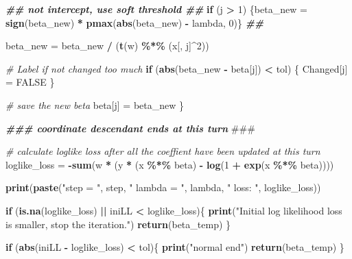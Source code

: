 \documentclass[
]{article}
\newenvironment{Shaded}{\begin{snugshade}}{\end{snugshade}}
\newcommand{\AlertTok}[1]{\textcolor[rgb]{0.94,0.16,0.16}{#1}}
\newcommand{\CommentTok}[1]{\textcolor[rgb]{0.56,0.35,0.01}{\textit{#1}}}
\newcommand{\ConstantTok}[1]{\textcolor[rgb]{0.56,0.35,0.01}{#1}}
\newcommand{\ControlFlowTok}[1]{\textcolor[rgb]{0.13,0.29,0.53}{\textbf{#1}}}
\newcommand{\DecValTok}[1]{\textcolor[rgb]{0.00,0.00,0.81}{#1}}
\newcommand{\DocumentationTok}[1]{\textcolor[rgb]{0.56,0.35,0.01}{\textbf{\textit{#1}}}}
\newcommand{\FunctionTok}[1]{\textcolor[rgb]{0.13,0.29,0.53}{\textbf{#1}}}
\newcommand{\NormalTok}[1]{#1}
\newcommand{\OtherTok}[1]{\textcolor[rgb]{0.56,0.35,0.01}{#1}}
\newcommand{\SpecialCharTok}[1]{\textcolor[rgb]{0.81,0.36,0.00}{\textbf{#1}}}
\newcommand{\StringTok}[1]{\textcolor[rgb]{0.31,0.60,0.02}{#1}}
\begin{document}
\begin{Shaded}
\begin{Highlighting}[]
      \DocumentationTok{\#\# not intercept, use soft threshold \#\#}
      \ControlFlowTok{if}\NormalTok{ (j }\SpecialCharTok{\textgreater{}} \DecValTok{1}\NormalTok{) }
\NormalTok{      \{beta\_new }\OtherTok{=} \FunctionTok{sign}\NormalTok{(beta\_new) }\SpecialCharTok{*} \FunctionTok{pmax}\NormalTok{(}\FunctionTok{abs}\NormalTok{(beta\_new) }\SpecialCharTok{{-}}\NormalTok{ lambda, }\DecValTok{0}\NormalTok{)\}}
      \DocumentationTok{\#\#}
      
\NormalTok{      beta\_new }\OtherTok{=}\NormalTok{ beta\_new }\SpecialCharTok{/}\NormalTok{ (}\FunctionTok{t}\NormalTok{(w) }\SpecialCharTok{\%*\%}\NormalTok{ (x[, j]}\SpecialCharTok{\^{}}\DecValTok{2}\NormalTok{))}
      
      \CommentTok{\# Label if not changed too much}
      \ControlFlowTok{if}\NormalTok{ (}\FunctionTok{abs}\NormalTok{(beta\_new }\SpecialCharTok{{-}}\NormalTok{ beta[j]) }\SpecialCharTok{\textless{}}\NormalTok{ tol) \{}
\NormalTok{        Changed[j] }\OtherTok{=} \ConstantTok{FALSE}
\NormalTok{      \}}
      
      \CommentTok{\# save the new beta}
\NormalTok{      beta[j] }\OtherTok{=}\NormalTok{ beta\_new}
\NormalTok{    \}}
    
    \DocumentationTok{\#\#\# coordinate descendant ends at this turn }\AlertTok{\#\#\#}
    
    
    \CommentTok{\# calculate loglike loss after all the coeffient have been updated at this turn}
\NormalTok{    loglike\_loss }\OtherTok{=} \SpecialCharTok{{-}}\FunctionTok{sum}\NormalTok{(w }\SpecialCharTok{*}\NormalTok{ (y }\SpecialCharTok{*}\NormalTok{ (x }\SpecialCharTok{\%*\%}\NormalTok{ beta) }\SpecialCharTok{{-}} \FunctionTok{log}\NormalTok{(}\DecValTok{1} \SpecialCharTok{+} \FunctionTok{exp}\NormalTok{(x }\SpecialCharTok{\%*\%}\NormalTok{ beta)))) }

    
    \FunctionTok{print}\NormalTok{(}\FunctionTok{paste}\NormalTok{(}\StringTok{"step = "}\NormalTok{, step, }\StringTok{" lambda = "}\NormalTok{, lambda, }\StringTok{" loss: "}\NormalTok{, loglike\_loss))}
    

    \ControlFlowTok{if}\NormalTok{ (}\FunctionTok{is.na}\NormalTok{(loglike\_loss) }\SpecialCharTok{||}\NormalTok{ iniLL }\SpecialCharTok{\textless{}}\NormalTok{ loglike\_loss)\{}
      \FunctionTok{print}\NormalTok{(}\StringTok{"Initial log likelihood loss is smaller, stop the iteration."}\NormalTok{)}
      \FunctionTok{return}\NormalTok{(beta\_temp)}
\NormalTok{    \}}
   
    \ControlFlowTok{if}\NormalTok{ (}\FunctionTok{abs}\NormalTok{(iniLL }\SpecialCharTok{{-}}\NormalTok{ loglike\_loss) }\SpecialCharTok{\textless{}}\NormalTok{ tol)\{}
      \FunctionTok{print}\NormalTok{(}\StringTok{"normal end"}\NormalTok{)}
      \FunctionTok{return}\NormalTok{(beta\_temp)}
\NormalTok{    \}}
      

\end{Highlighting}
\end{Shaded}
\end{document}
